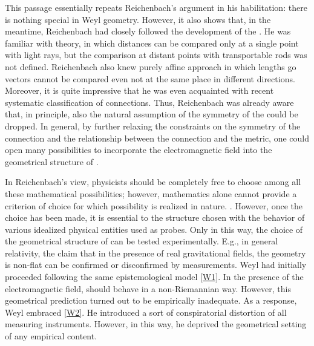 \documentclass[final]{article}
\newcommand{\WG}{Weyl geometry\xspace}
\begin{document}
%
This passage essentially repeats Reichenbach's argument in his habilitation: there is nothing special in \WG. However, it also shows that, in the meantime, Reichenbach had closely followed the development of the \uftp. He was familiar with   theory, in which distances can be compared only at a single point with light rays, but the comparison at distant points with transportable rods was not defined. Reichenbach also knew  purely affine approach in which lengths go vectors cannot be compared even not at the same place in different directions. Moreover, it is quite impressive that he was even acquainted with  recent systematic classification of connections. Thus, Reichenbach was already aware that, in principle, also the natural assumption of the symmetry of the \Gtmn could be dropped. In general, by further relaxing the constraints on the symmetry of the connection and the relationship between the connection and the metric, one could open many possibilities to incorporate the electromagnetic field into the geometrical structure of \spti. 

In Reichenbach's view, physicists should be completely free to choose among all these mathematical possibilities; however, mathematics alone cannot provide a criterion of choice for which possibility is realized in nature. . However, once the choice has been made, it is essential to  the structure chosen with the behavior of various idealized physical entities used as probes. Only in this way, the choice of the geometrical structure of \spti can be tested experimentally. E.g., in general relativity, the claim that in the presence of real gravitational fields, the \spti geometry is non-flat can be confirmed or disconfirmed by \rach measurements. Weyl had initially proceeded following the same epistemological model \ref{W1}. In the presence of the electromagnetic field, \rac should behave in a non-Riemannian way. However, this geometrical prediction turned out to be empirically inadequate. As a response, Weyl embraced \ref{W2}. He introduced a sort of conspiratorial distortion of all measuring instruments. However, in this way, he deprived the geometrical setting of any empirical content. 
\end{document}
